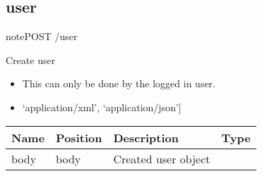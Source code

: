 \documentclass[letterpaper,10pt,english]{sphinxmanual}
\begin{document}
\subsection{user}
\label{\detokenize{dev-guide:user}}
\begin{sphinxadmonition}{note}{POST /user}

Create user\begin{itemize}
\item {} 
This can only be done by the logged in user.

\item {} 
\sphinxstylestrong{Produces: 
}{[}‘application/xml’, ‘application/json’{]}

\end{itemize}




\begin{savenotes}\sphinxattablestart
\centering
\begin{tabulary}{\linewidth}[t]{|T|T|T|T|}
\hline
\sphinxstyletheadfamily 
Name
&\sphinxstyletheadfamily 
Position
&\sphinxstyletheadfamily 
Description
&\sphinxstyletheadfamily 
Type
\\
\hline
body
&
body
&
Created user object
&

\\
\hline
\end{tabulary}
\par
\sphinxattableend\end{savenotes}


\end{sphinxadmonition}
\end{document}
